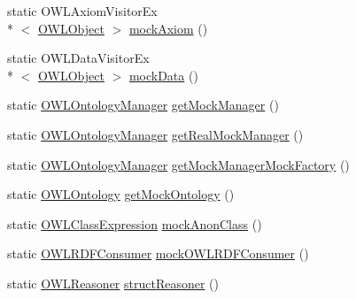 \begin{DoxyCompactItemize}
static O\-W\-L\-Axiom\-Visitor\-Ex\\*
$<$ \hyperlink{interfaceorg_1_1semanticweb_1_1owlapi_1_1model_1_1_o_w_l_object}{O\-W\-L\-Object} $>$ \hyperlink{classorg_1_1semanticweb_1_1owlapi_1_1contract_1_1_utils_afd5442e8f5a9d84896dc33ace616d921}{mock\-Axiom} ()
\item 
static O\-W\-L\-Data\-Visitor\-Ex\\*
$<$ \hyperlink{interfaceorg_1_1semanticweb_1_1owlapi_1_1model_1_1_o_w_l_object}{O\-W\-L\-Object} $>$ \hyperlink{classorg_1_1semanticweb_1_1owlapi_1_1contract_1_1_utils_aac7e00541288d543393ae686ab93fc65}{mock\-Data} ()
\item 
static \hyperlink{interfaceorg_1_1semanticweb_1_1owlapi_1_1model_1_1_o_w_l_ontology_manager}{O\-W\-L\-Ontology\-Manager} \hyperlink{classorg_1_1semanticweb_1_1owlapi_1_1contract_1_1_utils_a1519366626522d58237297d088dc7d66}{get\-Mock\-Manager} ()
\item 
static \hyperlink{interfaceorg_1_1semanticweb_1_1owlapi_1_1model_1_1_o_w_l_ontology_manager}{O\-W\-L\-Ontology\-Manager} \hyperlink{classorg_1_1semanticweb_1_1owlapi_1_1contract_1_1_utils_ac230d6ca7d092b2ac9e094da6f45194d}{get\-Real\-Mock\-Manager} ()
\item 
static \hyperlink{interfaceorg_1_1semanticweb_1_1owlapi_1_1model_1_1_o_w_l_ontology_manager}{O\-W\-L\-Ontology\-Manager} \hyperlink{classorg_1_1semanticweb_1_1owlapi_1_1contract_1_1_utils_a720d39851f43d006106acbdec698303e}{get\-Mock\-Manager\-Mock\-Factory} ()
\item 
static \hyperlink{interfaceorg_1_1semanticweb_1_1owlapi_1_1model_1_1_o_w_l_ontology}{O\-W\-L\-Ontology} \hyperlink{classorg_1_1semanticweb_1_1owlapi_1_1contract_1_1_utils_aca7f92a21853c0845833cfea116e5c16}{get\-Mock\-Ontology} ()
\item 
static \hyperlink{interfaceorg_1_1semanticweb_1_1owlapi_1_1model_1_1_o_w_l_class_expression}{O\-W\-L\-Class\-Expression} \hyperlink{classorg_1_1semanticweb_1_1owlapi_1_1contract_1_1_utils_ab5296d7f3840ef89a158bd8657e88a29}{mock\-Anon\-Class} ()
\item 
static \hyperlink{classorg_1_1coode_1_1owlapi_1_1rdfxml_1_1parser_1_1_o_w_l_r_d_f_consumer}{O\-W\-L\-R\-D\-F\-Consumer} \hyperlink{classorg_1_1semanticweb_1_1owlapi_1_1contract_1_1_utils_aeb4ad379d3416810a120bdc249601786}{mock\-O\-W\-L\-R\-D\-F\-Consumer} ()
\item 
static \hyperlink{interfaceorg_1_1semanticweb_1_1owlapi_1_1reasoner_1_1_o_w_l_reasoner}{O\-W\-L\-Reasoner} \hyperlink{classorg_1_1semanticweb_1_1owlapi_1_1contract_1_1_utils_a4d1d58a64985fa85de8209b1b20bf522}{struct\-Reasoner} ()

\end{DoxyCompactItemize}
